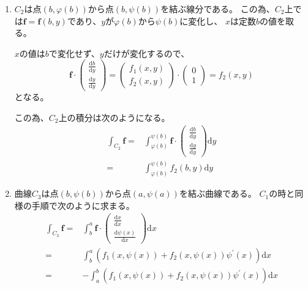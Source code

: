 \documentclass[12pt,b5paper]{ltjsarticle}
\begin{document}
\begin{enumerate}
 \item
      $C_2$は点$(b,\varphi(b))$から点$(b,\psi(b))$を結ぶ線分である。
      この為、$C_2$上では$\bm{f}=\bm{f}(b,y)$であり、$y$が$\varphi(b)$から$\psi(b)$に変化し、
      $x$は定数$b$の値を取る。

      $x$の値は$b$で変化せず、$y$だけが変化するので、
      \begin{equation}
       \bm{f}\cdot \begin{pmatrix}\frac{\mathrm{d}b}{\mathrm{d}y}\\\frac{\mathrm{d}y}{\mathrm{d}y}\end{pmatrix}
       = \begin{pmatrix}f_1(x,y)\\f_2(x,y)\end{pmatrix}
      \cdot \begin{pmatrix}0\\1\end{pmatrix}
      = f_2(x,y)
      \end{equation}
      となる。

      この為、$C_2$上の積分は次のようになる。
      \begin{align}
      \int_{C_2}\bm{f}
       =& \int_{\varphi(b)}^{\psi(b)}\bm{f}
             \cdot\begin{pmatrix}\frac{\mathrm{d}b}{\mathrm{d}y}\\\frac{\mathrm{d}y}{\mathrm{d}y}\end{pmatrix}\mathrm{d}y\\
       =& \int_{\varphi(b)}^{\psi(b)}f_2(b,y)\mathrm{d}y
      \end{align}

 \item
      曲線$C_3$は点$(b,\psi(b))$から点$(a,\psi(a))$を結ぶ曲線である。
      $C_1$の時と同様の手順で次のように求まる。
      \begin{align}
       \int_{C_3}\bm{f}
       =& \int_{b}^{a}\bm{f}
             \cdot\begin{pmatrix}\frac{\mathrm{d}x}{\mathrm{d}x}\\\frac{\mathrm{d}\psi(x)}{\mathrm{d}x}\end{pmatrix}\mathrm{d}x\\
       =& \int_{b}^{a}
       \left(f_1(x,\psi(x)) + f_2(x,\psi(x))\psi^{\prime}(x)\right)\mathrm{d}x\\
       =& - \int_{a}^{b}(f_1(x,\psi(x)) + f_2(x,\psi(x))\psi^{\prime}(x))\mathrm{d}x
      \end{align}


\end{enumerate}
\end{document}
